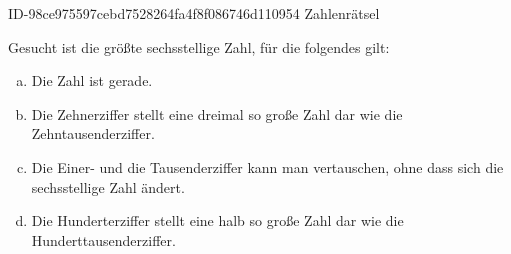\begin{exercise}
      {ID-98ce975597cebd7528264fa4f8f086746d110954}
      {Zahlenrätsel}
  \ifproblem\problem\par
    Gesucht ist die größte sechsstellige Zahl, für die folgendes gilt:
    \begin{enumerate}[a)]
      \squeeze
      \item Die Zahl ist gerade.
      \item Die Zehnerziffer stellt eine dreimal so große Zahl dar wie
            die Zehntausenderziffer.
      \item Die Einer- und die Tausenderziffer kann man vertauschen,
            ohne dass sich die sechsstellige Zahl ändert.
      \item Die Hunderterziffer stellt eine halb so große Zahl dar wie
            die Hunderttausenderziffer.
    \end{enumerate}
  \fi
\end{exercise}
